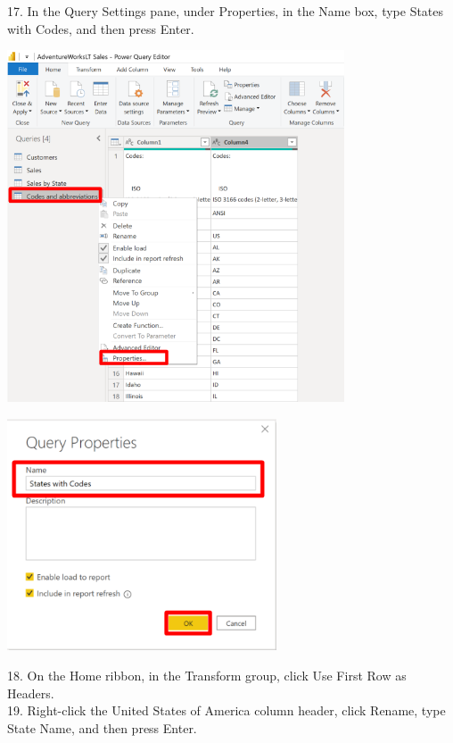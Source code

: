 \documentclass[12pt,letterpaper]{article}
\begin{document}
17. In the Query Settings pane, under Properties, in the Name box, type States with Codes, and then press
Enter.
\begin{center}
    \includegraphics[width=10cm]{img/56.png}  
\end{center}
\begin{center}
    \includegraphics[width=8cm]{img/57.png}  
\end{center}
18. On the Home ribbon, in the Transform group, click Use First Row as Headers.
\\19. Right-click the United States of America column header, click Rename, type State Name, and then press
Enter.
\end{document}
